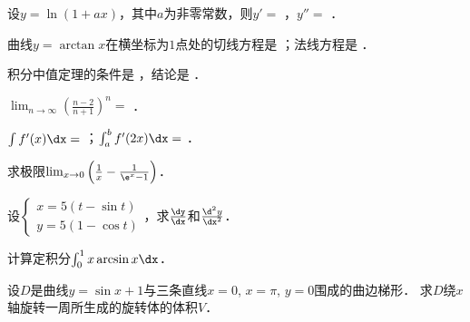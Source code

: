\documentclass[plain,noanswer,medmath]{../../template/jnuexam}
\begin{document}






\begin{problem}
设$y=\ln(1+ax)$，其中$a$为非零常数，则$y'=$ \fillin{}，$y''=$ \fillin{}．
\end{problem}


\begin{problem}
曲线$y = \arctan x$在横坐标为$1$点处的切线方程是 \fillin{}；法线方程是 \fillin{}．
\end{problem}


\begin{problem}
积分中值定理的条件是 \fillin{}，结论是 \fillin{}．
\end{problem}


\begin{problem}
$\lim_{n\to\infty}\left(\frac{n-2}{n+1}\right)^n=$ \fillin{}．
\end{problem}


\begin{problem}
$\int f'(x)\dx =$ \fillin{}；$\int_a^b f'(2x)\dx =$ \fillin{}．
\end{problem}



\begin{problem}
求极限$\lim_{x \to 0} \left(\frac{1}{x} - \frac{1}{\e^x - 1}\right)$．
\end{problem}



\begin{problem}
设$\begin{cases}
  x = 5(t - \sin t) \\
  y = 5(1 - \cos t)
\end{cases}$，求$\frac{\dy}{\dx}$和$\frac{\d^2y}{\dx^2}$．
\end{problem}



\begin{problem}
计算定积分$\int_0^1x\arcsin x\dx$．
\end{problem}



\begin{problem}
设$D$是曲线$y = \sin x + 1$与三条直线$x = 0$, $x = \pi$, $y = 0$围成的曲边梯形．
求$D$绕$x$轴旋转一周所生成的旋转体的体积$V$．
\end{problem}
\end{document}
